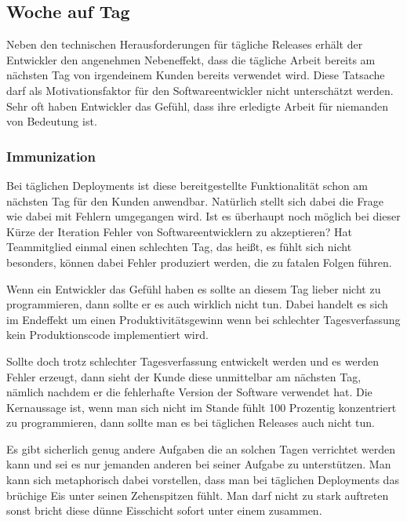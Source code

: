 \subsection{Woche auf Tag}
\label{subsec:subscription-modell}

Neben den technischen Herausforderungen für tägliche Releases erhält der Entwickler den angenehmen Nebeneffekt, dass die tägliche Arbeit bereits am nächsten Tag von irgendeinem Kunden bereits verwendet wird. Diese Tatsache darf als Motivationsfaktor für den Softwareentwickler nicht unterschätzt werden. Sehr oft haben Entwickler das Gefühl, dass ihre erledigte Arbeit für niemanden  von Bedeutung ist.

\subsubsection{Immunization}
\label{minisec:immunization}
Bei täglichen Deployments ist diese bereitgestellte Funktionalität schon am nächsten Tag für den Kunden anwendbar. Natürlich stellt sich dabei die Frage wie dabei mit Fehlern umgegangen wird. Ist es überhaupt noch möglich bei dieser Kürze der Iteration Fehler von Softwareentwicklern zu akzeptieren? Hat Teammitglied einmal einen schlechten Tag, das heißt, es fühlt sich nicht besonders, können dabei Fehler produziert werden, die zu fatalen Folgen führen. 

Wenn ein Entwickler das Gefühl haben es sollte an diesem Tag lieber nicht zu programmieren, dann sollte er es auch wirklich nicht tun. Dabei handelt es sich im Endeffekt um einen Produktivitätsgewinn wenn bei schlechter Tagesverfassung kein Produktionscode implementiert wird. 

Sollte doch trotz schlechter Tagesverfassung entwickelt werden und es werden Fehler erzeugt, dann sieht der Kunde diese unmittelbar am nächsten Tag, nämlich nachdem er die fehlerhafte Version der Software verwendet hat. Die Kernaussage ist, wenn man sich nicht im Stande fühlt 100 Prozentig konzentriert zu programmieren, dann sollte man es bei täglichen Releases auch nicht tun. 

Es gibt sicherlich genug andere Aufgaben die an solchen Tagen verrichtet werden kann und sei es nur jemanden anderen bei seiner Aufgabe zu unterstützen. Man kann sich metaphorisch dabei vorstellen, dass man bei täglichen Deployments das brüchige Eis unter seinen Zehenspitzen fühlt. Man darf nicht zu stark auftreten sonst bricht diese dünne Eisschicht sofort unter einem zusammen. 

